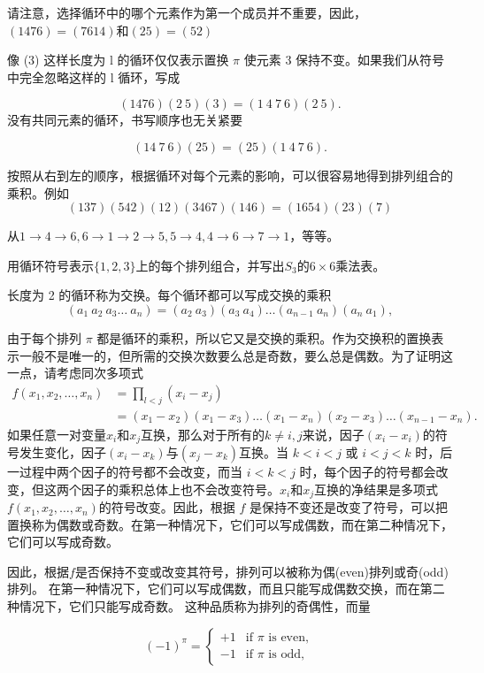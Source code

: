 请注意，选择循环中的哪个元素作为第一个成员并不重要，因此，$( 1476) = ( 7614) $和$( 25) = ( 52) $

像 (3) 这样长度为 l 的循环仅仅表示置换 $\pi$ 使元素 3 保持不变。如果我们从符号中完全忽略这样的 l 循环，写成

$$
(1476)(2\:5)(3)=(1\:4\:7\:6)(2\:5).
$$
没有共同元素的循环，书写顺序也无关紧要

$$
(14\:7\:6)(25)=(25)(1\:4\:7\:6).
$$

按照从右到左的顺序，根据循环对每个元素的影响，可以很容易地得到排列组合的乘积。例如
$$
(137)(542)(12)(3467)(146)=(1654)(23)(7)
$$

从$1\to4\to6,6\to1\to2\to5,5\to4,4\to6\to7\to1$，等等。
\begin{exercise}
     用循环符号表示$\{1,2,3\}$上的每个排列组合，并写出$S_{3}$的$6\times6$乘法表。
\end{exercise}
长度为 2 的循环称为交换。每个循环都可以写成交换的乘积
$$
(a_{1}\:a_{2}\:a_{3}\ldots\:a_{n})=(a_{2}\:a_{3})(a_{3}\:a_{4})\ldots(a_{n-1}\:a_{n})(a_{n}\:a_{1}),
$$

由于每个排列 $\pi$ 都是循环的乘积，所以它又是交换的乘积。作为交换积的置换表示一般不是唯一的，但所需的交换次数要么总是奇数，要么总是偶数。为了证明这一点，请考虑同次多项式
\begin{align*}
    f(x_1,x_2,\dots,x_n)&=\prod_{l<j}(x_i-x_j)\\
    &=(x_1-x_2)(x_1-x_3)\dots(x_1-x_n)(x_2-x_3)\dots(x_{n-1}-x_n).
\end{align*}
如果任意一对变量$x_i$和$x_{j}$互换，那么对于所有的$k\neq i,j$来说，因子$(x_i-x_i)$的符号发生变化，因子$(x_i-x_k)$与$(x_j-x_k)$互换。当 $k<i<j$ 或 $i<j<k$ 时，后一过程中两个因子的符号都不会改变，而当 $i<k<j$ 时，每个因子的符号都会改变，但这两个因子的乘积总体上也不会改变符号。$x_i$和$x_j$互换的净结果是多项式$f(x_1,x_2,\ldots,x_n)$的符号改变。因此，根据 $f$ 是保持不变还是改变了符号，可以把置换称为偶数或奇数。在第一种情况下，它们可以写成偶数，而在第二种情况下，它们可以写成奇数。

因此，根据$f$是否保持不变或改变其符号，排列可以被称为偶(even)排列或奇(odd)排列。 在第一种情况下，它们可以写成偶数，而且只能写成偶数交换，而在第二种情况下，它们只能写成奇数。 这种品质称为排列的奇偶性，而量

$$
(-1)^\pi=\begin{cases}+1&\text{if $\pi$ is even},\\-1&\text{if $\pi$ is odd},\end{cases}
$$

